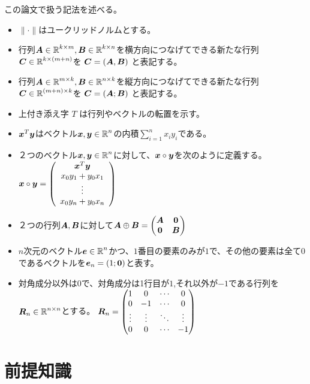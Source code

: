 \documentclass[11pt,a4paper,dvipdfmx,titlepage,uplatex]{jsarticle}
\theoremstyle{mystyle}
\newcommand{\0}{\mathbf{0}}
\def\0{\mbox{\bf 0}}
\def\e{\mbox{\boldmath $e$}}
\def\x{\mbox{\boldmath $x$}}
\def\y{\mbox{\boldmath $y$}}
\def\A{\mbox{\boldmath $A$}}
\def\B{\mbox{\boldmath $B$}}
\def\C{\mbox{\boldmath $C$}}
\def\R{\mbox{\boldmath $R$}}
\def\Real{\mbox{$\mathbb{R}$}}
\begin{document}
この論文で扱う記法を述べる。
\begin{itemize}
  \item $\|\cdot\|$はユークリッドノルムとする。
  \item 行列$\A \in \Real^{k \times m} , \B \in \Real^{k \times n}$を横方向につなげてできる新たな行列$\C \in \Real^{k \times (m+n)}$を
  $ \C = (\A, \B)$ と表記する。
  \item 行列$\A \in \Real^{m \times k} , \B \in \Real^{n \times k}$を縦方向につなげてできる新たな行列$\C \in \Real^{(m+n) \times k}$を
$    \C = (\A ; \B)$ と表記する。
  \item 上付き添え字 $T$ は行列やベクトルの転置を示す。
  \item $\x^T \y$はベクトル$\x,\y \in \Real^n$の内積$\sum_{i=1}^n x_i y_i$である。
  \item ２つのベクトル$\x , \y \in \Real^n$に対して、$\x \circ \y$を次のように定義する。\\
$\x \circ \y = \left(
  \begin{array}{c}
    \x^T \y \\
    x_0 y_1 + y_0 x_1 \\
    \vdots \\
    x_0 y_n + y_0 x_n
  \end{array} \right)
  $
  \item ２つの行列$\A , \B$に対して$\A \oplus \B =
  \begin{pmatrix}
    \A & \0 \\
    \0 & \B \\
  \end{pmatrix}$
  \item $n$次元のベクトル$\e \in \Real^n$かつ、$1$番目の要素のみが$1$で、その他の要素は全て$0$であるベクトルを$\e_n = (1 ; \0)$と表す。
  \item 対角成分以外は0で、対角成分は1行目が$1$,それ以外が$-1$である行列を$\R_n \in \Real^{n \times n}$とする。
  $
  \R_n =
  \begin{pmatrix}
    1 & 0 & \cdots & 0 \\
    0 & -1 & \cdots & 0 \\
    \vdots & \vdots & \ddots & \vdots \\
    0 & 0 & \cdots & -1 \\
  \end{pmatrix}
  $
\end{itemize}

\clearpage

\section{前提知識}\label{sec:preliminaries}
\end{document}

